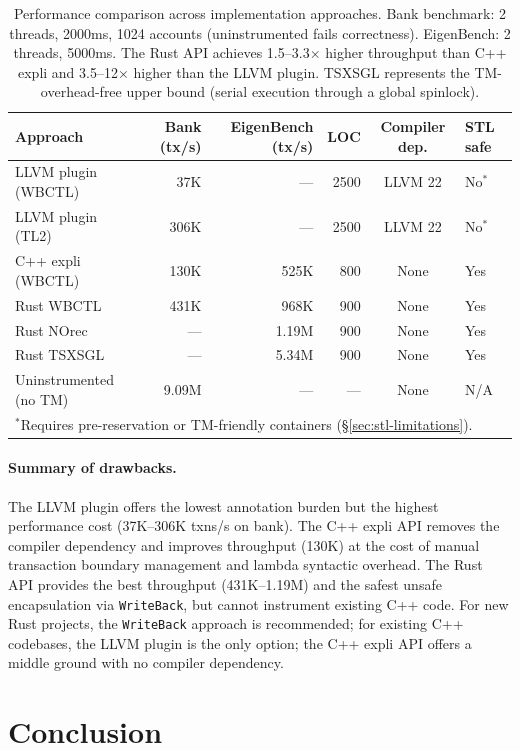 \documentclass[article,12pt]{article}
\begin{document}
\begin{table}[h]
\centering
\small
\begin{tabular}{lrrrcl}
\toprule
Approach & Bank (tx/s) & EigenBench (tx/s) & LOC & Compiler dep. & STL safe \\
\midrule
LLVM plugin (WBCTL) & 37K & --- & 2500 & LLVM 22 & No$^*$ \\
LLVM plugin (TL2) & 306K & --- & 2500 & LLVM 22 & No$^*$ \\
C++ expli (WBCTL) & 130K & 525K & 800 & None & Yes \\
Rust WBCTL & 431K & 968K & 900 & None & Yes \\
Rust NOrec & --- & 1.19M & 900 & None & Yes \\
Rust TSXSGL & --- & 5.34M & 900 & None & Yes \\
Uninstrumented (no TM) & 9.09M & --- & --- & None & N/A \\
\bottomrule
\multicolumn{6}{l}{\small $^*$Requires pre-reservation or TM-friendly containers (\S\ref{sec:stl-limitations}).}\\
\end{tabular}
\caption{Performance comparison across implementation approaches.
Bank benchmark: 2 threads, 2000ms, 1024 accounts (uninstrumented fails
correctness).  EigenBench: 2 threads, 5000ms.  The Rust API achieves
1.5--3.3$\times$ higher throughput than C++ expli and 3.5--12$\times$
higher than the LLVM plugin.  TSXSGL represents the TM-overhead-free
upper bound (serial execution through a global spinlock).}
\label{tab:impl-comparison}
\end{table}

\paragraph{Summary of drawbacks.}
The LLVM plugin offers the lowest annotation burden but the highest
performance cost (37K--306K txns/s on bank).  The C++ expli API removes
the compiler dependency and improves throughput (130K) at the cost of
manual transaction boundary management and lambda syntactic overhead.
The Rust API provides the best throughput (431K--1.19M) and the safest
unsafe encapsulation via \texttt{WriteBack}, but cannot instrument
existing C++ code.  For new Rust projects, the \texttt{WriteBack}
approach is recommended; for existing C++ codebases, the LLVM plugin
is the only option; the C++ expli API offers a middle ground with no
compiler dependency.

\section{Conclusion}
\end{document}
